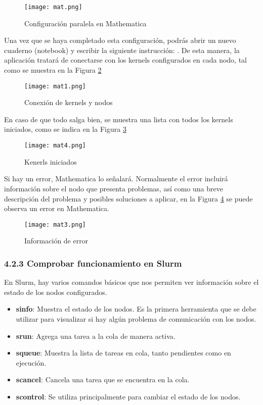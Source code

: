 \begin{spacing}{1.5}
  \begin{figure}[h]
    \centering
    \texttt{[image: mat.png]}
    \caption{Configuración paralela en Mathematica}
    \label{fig:etiqueta1}
  \end{figure}

  Una vez que se haya completado esta configuración, podrás abrir un nuevo
  cuaderno (notebook) y escribir la siguiente instrucción: . De esta manera, la aplicación tratará de conectarse con los kernels
  configurados en cada nodo, tal como se muestra en la Figura
  \ref{fig:etiqueta2}

  \begin{figure}[h]
    \centering
    \texttt{[image: mat1.png]}
    \caption{Conexión de kernels y nodos}
    \label{fig:etiqueta2}
  \end{figure}

  En caso de que todo salga bien, se muestra una lista con todos los kernels
  iniciados, como se indica en la Figura \ref{fig:etiqueta3}

  \begin{figure}[h]
    \centering
    \texttt{[image: mat4.png]}
    \caption{Kenerls iniciados}
    \label{fig:etiqueta3}
  \end{figure}

  Si hay un error, Mathematica lo señalará. Normalmente el error incluirá
  información sobre el nodo que presenta problemas, así como una breve
  descripción del problema y posibles soluciones a aplicar, en la Figura
  \ref{fig:etiqueta4} se puede observa un error en Mathematica.

  \begin{figure}[h]
    \centering
    \texttt{[image: mat3.png]}
    \caption{Información de error}
    \label{fig:etiqueta4}
  \end{figure}

  \subsubsection {4.2.3 Comprobar funcionamiento en Slurm}

  En Slurm, hay varios comandos básicos que nos permiten ver información sobre
  el
  estado de los nodos configurados.

  \begin{itemize}
    \item \textbf{sinfo}: Muestra el estado de los nodos. Es la primera
          herramienta que se debe utilizar para visualizar si hay algún
          problema de
          comunicación con los nodos.
    \item \textbf{srun}: Agrega una tarea a la cola de manera activa.
    \item \textbf{squeue}: Muestra la lista de tareas en cola, tanto pendientes
          como en ejecución.
    \item \textbf{scancel}: Cancela una tarea que se encuentra en la cola.
    \item \textbf{scontrol}: Se utiliza principalmente para cambiar el estado
          de los nodos.
  \end{itemize}


\end{spacing}
